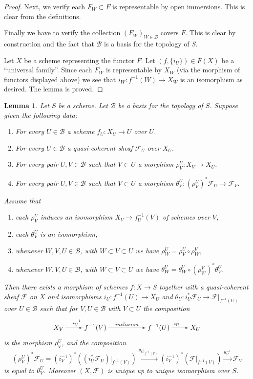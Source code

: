 \documentclass{stacks-project}
\theoremstyle{plain}
\newtheorem{lemma}[subsection]{Lemma}
\theoremstyle{definition}
\theoremstyle{remark}
\numberwithin{equation}{subsection}
\begin{document}
\begin{proof}
\medskip\noindent
Next, we verify each $F_W \subset F$ is representable by open immersions.
This is clear from the definitions.

\medskip\noindent
Finally we have to verify
the collection $(F_W)_{W \in \mathcal{B}}$ covers $F$.
This is clear by construction and the fact that $\mathcal{B}$ is
a basis for the topology of $S$.

\medskip\noindent
Let $X$ be a scheme representing the functor $F$.
Let $(f, \{i_U\}) \in F(X)$ be a ``universal family''.
Since each $F_W$ is representable by $X_W$ (via the morphism of functors
displayed above) we see that $i_W : f^{-1}(W) \to X_W$
is an isomorphism as desired. The lemma is proved.
\end{proof}

\begin{lemma}
\label{lemma-relative-glueing-sheaves}
Let $S$ be a scheme.
Let $\mathcal{B}$ be a basis for the topology of $S$.
Suppose given the following data:
\begin{enumerate}
\item For every $U \in \mathcal{B}$ a scheme $f_U : X_U \to U$ over $U$.
\item For every $U \in \mathcal{B}$ a quasi-coherent sheaf $\mathcal{F}_U$
over $X_U$.
\item For every pair $U, V \in \mathcal{B}$ such that
$V \subset U$ a morphism $\rho^U_V : X_V \to X_U$.
\item  For every pair $U, V \in \mathcal{B}$ such that
$V \subset U$ a morphism
$\theta^U_V : (\rho^U_V)^*\mathcal{F}_U \to \mathcal{F}_V$.
\end{enumerate}
Assume that
\begin{enumerate}
\item[(a)] each $\rho^U_V$ induces an isomorphism
$X_V \to f_U^{-1}(V)$ of schemes over $V$,
\item[(b)] each $\theta^U_V$ is an isomorphism,
\item[(c)] whenever $W, V, U \in \mathcal{B}$, with
$W \subset V \subset U$ we have $\rho^U_W = \rho^U_V \circ \rho ^V_W$,
\item[(d)] whenever $W, V, U \in \mathcal{B}$, with
$W \subset V \subset U$ we have
$\theta^U_W = \theta^V_W \circ (\rho^V_W)^*\theta^U_V$.
\end{enumerate}
Then there exists a morphism of schemes $f : X \to S$
together with a quasi-coherent sheaf $\mathcal{F}$ on $X$
and isomorphisms $i_U : f^{-1}(U) \to X_U$ and
$\theta_U : i_U^*\mathcal{F}_U \to \mathcal{F}|_{f^{-1}(U)}$
over $U \in \mathcal{B}$ such that
for $V, U \in \mathcal{B}$ with $V \subset U$ the composition
$$
\xymatrix{
X_V \ar[r]^{i_V^{-1}} &
f^{-1}(V) \ar[rr]^{inclusion} & &
f^{-1}(U) \ar[r]^{i_U} &
X_U
}
$$
is the morphism $\rho^U_V$, and the composition
\begin{equation}
\label{equation-glue}
(\rho^U_V)^*\mathcal{F}_U
=
(i_V^{-1})^*((i_U^*\mathcal{F}_U)|_{f^{-1}(V)})
\xrightarrow{\theta_U|_{f^{-1}(V)}}
(i_V^{-1})^*(\mathcal{F}|_{f^{-1}(V)})
\xrightarrow{\theta_V^{-1}}
\mathcal{F}_V
\end{equation}
is equal to $\theta^U_V$. Moreover $(X, \mathcal{F})$ is unique
up to unique isomorphism over $S$.
\end{lemma}
\end{document}
